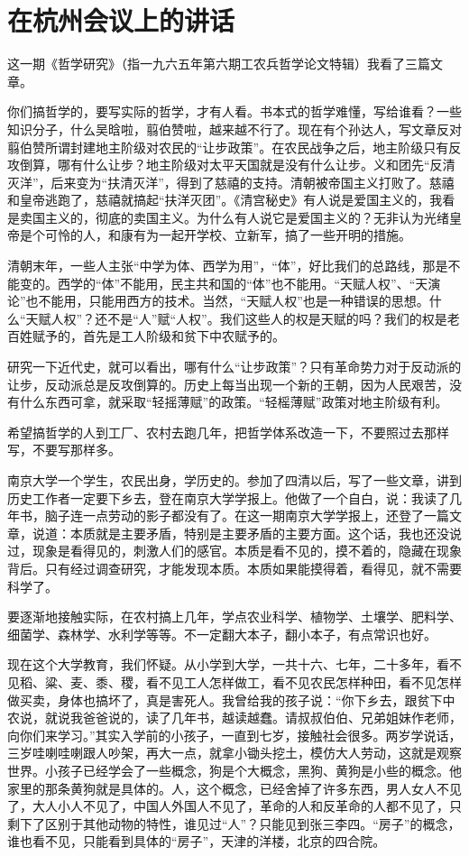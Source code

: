 \section[在杭州会议上的讲话（一九六五年十二月二十一日）]{在杭州会议上的讲话}


这一期《哲学研究》（指一九六五年第六期工农兵哲学论文特辑）我看了三篇文章。

你们搞哲学的，要写实际的哲学，才有人看。书本式的哲学难懂，写给谁看？一些知识分子，什么吴晗啦，翦伯赞啦，越来越不行了。现在有个孙达人，写文章反对翦伯赞所谓封建地主阶级对农民的“让步政策”。在农民战争之后，地主阶级只有反攻倒算，哪有什么让步？地主阶级对太平天国就是没有什么让步。义和团先“反清灭洋”，后来变为“扶清灭洋”，得到了慈禧的支持。清朝被帝国主义打败了。慈禧和皇帝逃跑了，慈禧就搞起“扶洋灭团”。《清宫秘史》有人说是爱国主义的，我看是卖国主义的，彻底的卖国主义。为什么有人说它是爱国主义的？无非认为光绪皇帝是个可怜的人，和康有为一起开学校、立新军，搞了一些开明的措施。

清朝末年，一些人主张“中学为体、西学为用”，“体”，好比我们的总路线，那是不能变的。西学的“体”不能用，民主共和国的“体”也不能用。“天赋人权”、“天演论”也不能用，只能用西方的技术。当然，“天赋人权”也是一种错误的思想。什么“天赋人权”？还不是“人”赋“人权”。我们这些人的权是天赋的吗？我们的权是老百姓赋予的，首先是工人阶级和贫下中农赋予的。

研究一下近代史，就可以看出，哪有什么“让步政策”？只有革命势力对于反动派的让步，反动派总是反攻倒算的。历史上每当出现一个新的王朝，因为人民艰苦，没有什么东西可拿，就采取“轻摇薄赋”的政策。“轻榣薄赋”政策对地主阶级有利。

希望搞哲学的人到工厂、农村去跑几年，把哲学体系改造一下，不要照过去那样写，不要写那样多。

南京大学一个学生，农民出身，学历史的。参加了四清以后，写了一些文章，讲到历史工作者一定要下乡去，登在南京大学学报上。他做了一个自白，说：我读了几年书，脑子连一点劳动的影子都没有了。在这一期南京大学学报上，还登了一篇文章，说道：本质就是主要矛盾，特别是主要矛盾的主要方面。这个话，我也还没说过，现象是看得见的，刺激人们的感官。本质是看不见的，摸不着的，隐藏在现象背后。只有经过调查研究，才能发现本质。本质如果能摸得着，看得见，就不需要科学了。

要逐渐地接触实际，在农村搞上几年，学点农业科学、植物学、土壤学、肥料学、细菌学、森林学、水利学等等。不一定翻大本子，翻小本子，有点常识也好。

现在这个大学教育，我们怀疑。从小学到大学，一共十六、七年，二十多年，看不见稻、粱、麦、黍、稷，看不见工人怎样做工，看不见农民怎样种田，看不见怎样做买卖，身体也搞坏了，真是害死人。我曾给我的孩子说：“你下乡去，跟贫下中农说，就说我爸爸说的，读了几年书，越读越蠢。请叔叔伯伯、兄弟姐妹作老师，向你们来学习。”其实入学前的小孩子，一直到七岁，接触社会很多。两岁学说话，三岁哇喇哇喇跟人吵架，再大一点，就拿小锄头挖土，模仿大人劳动，这就是观察世界。小孩子已经学会了一些概念，狗是个大概念，黑狗、黄狗是小些的概念。他家里的那条黄狗就是具体的。人，这个概念，已经舍掉了许多东西，男人女人不见了，大人小人不见了，中国人外国人不见了，革命的人和反革命的人都不见了，只剩下了区别于其他动物的特性，谁见过“人”？只能见到张三李四。“房子”的概念，谁也看不见，只能看到具体的“房子”，天津的洋楼，北京的四合院。

